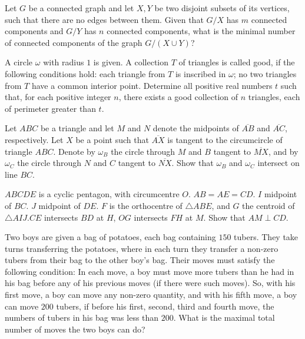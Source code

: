 \documentclass[11pt]{scrartcl}
\begin{document}
\begin{problem}[8612979541975584705]
	Let $G$ be a connected graph and let $X, Y$ be two disjoint subsets of its vertices, such that there are no edges between them. Given that $G/X$ has $m$ connected components and $G/Y$ has $n$ connected components, what is the minimal number of connected components of the graph $G/(X \cup Y)$?
\end{problem}
\begin{problem}[2265193939454652363]
	A circle $\omega$ with radius $1$ is given. A collection $T$ of triangles is called good, if the following conditions hold:
each triangle from $T$ is inscribed in $\omega$;
no two triangles from $T$ have a common interior point.
Determine all positive real numbers $t$ such that, for each positive integer $n$, there exists a good collection of $n$ triangles, each of perimeter greater than $t$.
\end{problem}
\begin{problem}[503121367540901]
	Let $ABC$ be a triangle and let $M$ and $N$ denote the midpoints of $\overline{AB}$ and $\overline{AC}$, respectively. Let $X$ be a point such that $\overline{AX}$ is tangent to the circumcircle of triangle $ABC$. Denote by $\omega_B$ the circle through $M$ and $B$ tangent to $\overline{MX}$, and by $\omega_C$ the circle through $N$ and $C$ tangent to $\overline{NX}$. Show that $\omega_B$ and $\omega_C$ intersect on line $BC$.
\end{problem}
\begin{problem}[8811824418974048155]
$ABCDE$ is a cyclic pentagon, with circumcentre $O$. $AB=AE=CD$. $I$ midpoint of $BC$. $J$ midpoint of $DE$. $F$ is the orthocentre of $\triangle ABE$, and $G$ the centroid of $\triangle AIJ$.$CE$ intersects $BD$ at $H$, $OG$ intersects $FH$ at $M$. Show that $AM\perp CD$.
\end{problem}
\begin{problem}[326164407850848]
Two boys are given a bag of potatoes, each bag containing $150$ tubers. They take turns transferring the potatoes, where in each turn they transfer a non-zero tubers from their bag to the other boy's bag. Their moves must satisfy the following condition: In each move, a boy must move more tubers than he had in his bag before any of his previous moves (if there were such moves). So, with his first move, a boy can move any non-zero quantity, and with his fifth move, a boy can move $200$ tubers, if before his first, second, third and fourth move, the numbers of tubers in his bag was less than $200$. What is the maximal total number of moves the two boys can do?
\end{problem}
\end{document}
